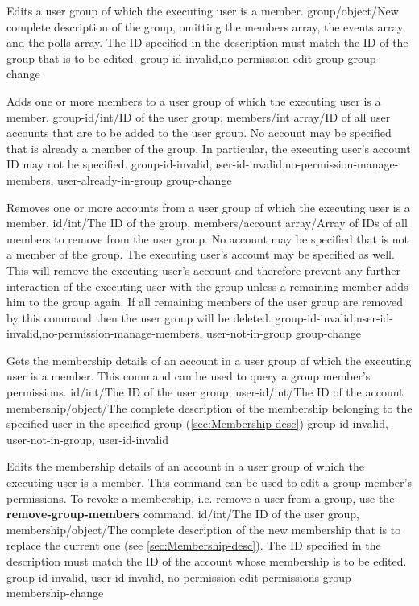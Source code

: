\documentclass[parskip=full,11pt]{scrartcl}
\begin{document}
{Edits a user group of which the executing user is a member.}
{group/object/New complete description of the group{,} omitting the members
array{,} the events array{,} and the polls array.
The ID specified in the description must match the ID of the group that
is to be edited.}
{}
{group-id-invalid,no-permission-edit-group}
{group-change}

{Adds one or more members to a user group of which the executing user is a
member.}
{group-id/int/ID of the user group,
members/int array/ID of all user accounts that are to be added to the user
group.
No account may be specified that is already a member of the group.
In particular{,} the executing user's account ID may not be specified.}
{}
{group-id-invalid,user-id-invalid,no-permission-manage-members,%
user-already-in-group}
{group-change}

{Removes one or more accounts from a user group of which the executing user is
a member.}
{id/int/The ID of the group,
members/account array/Array of IDs of all members to remove from the user
group.
No account may be specified that is not a member of the group.
The executing user's account may be specified as well.
This will remove the executing user's account and therefore prevent any further
interaction of the executing user with the group unless a remaining member adds
him to the group again.
If all remaining members of the user group are removed by this command then the
user group will be deleted.}
{}
{group-id-invalid,user-id-invalid,no-permission-manage-members,
user-not-in-group}
{group-change}

{Gets the membership details of an account in a user group of which the
executing user is a member.
This command can be used to query a group member's permissions.}
{id/int/The ID of the user group,
user-id/int/The ID of the account}
{membership/object/The complete description of the membership belonging to
the specified user in the specified group (\ref{sec:Membership-desc})}
{group-id-invalid, user-not-in-group, user-id-invalid}
{}

{Edits the membership details of an account in a user group of which the
executing user is a member.
This command can be used to edit a group member's permissions.
To revoke a membership, i.e. remove a user from a group, use the
\textbf{remove-group-members} command.}
{id/int/The ID of the user group,
membership/object/The complete description of the new membership that is to
replace the current one (see \ref{sec:Membership-desc}).
The ID specified in the description must match the ID of the account whose
membership is to be edited.}
{}
{group-id-invalid, user-id-invalid, no-permission-edit-permissions}
{group-membership-change}
\end{document}
